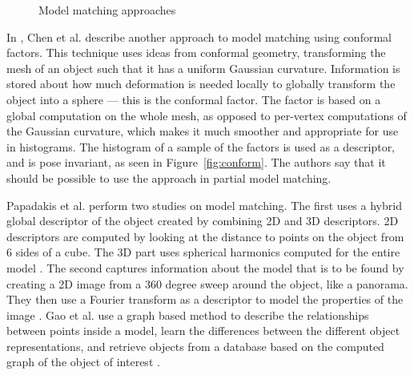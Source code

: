 \documentclass[11pt,a4paper]{kth-mag}
\begin{document}
\begin{figure}
  \centering
  \caption{Model matching approaches}
  \label{fig:modelmatch}
\end{figure}
In \cite{ben2008characterizing}, Chen et al. describe another approach to model
matching using conformal factors. This technique uses ideas from conformal
geometry, transforming the mesh of an object such that it has a uniform Gaussian
curvature. Information is stored about how much deformation is needed locally to
globally transform the object into a sphere --- this is the conformal factor.
The factor is based on a global computation on the whole mesh, as opposed to
per-vertex computations of the Gaussian curvature, which makes it much smoother
and appropriate for use in histograms. The histogram of a sample of the factors
is used as a descriptor, and is pose invariant, as seen in
Figure~\ref{fig:conform}. The authors say that it should be possible to use the
approach in partial model matching.

Papadakis et al. perform two studies on model matching. The first uses a hybrid
global descriptor of the object created by combining 2D and 3D descriptors. 2D
descriptors are computed by looking at the distance to points on the object from
6 sides of a cube. The 3D part uses spherical harmonics computed for the entire
model \cite{papadakis20083d}. The second captures information about the model
that is to be found by creating a 2D image from a 360 degree sweep around the
object, like a panorama. They then use a Fourier transform as a descriptor to
model the properties of the image \cite{papadakis2010panorama}. Gao et al. use a
graph based method to describe the relationships between points inside a model,
learn the differences between the different object representations, and retrieve
objects from a database based on the computed graph of the object of interest
\cite{gao20123}.
\end{document}
